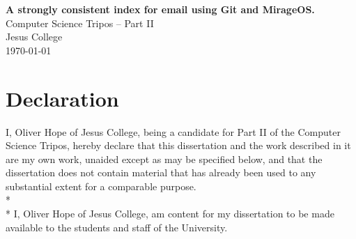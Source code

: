 \documentclass[12pt,a4paper,twoside,openright]{report}
\begin{document}

\thispagestyle{empty}



\vspace*{60mm}
\begin{center}
\Huge
\textbf{A strongly consistent index for email using Git and MirageOS.} \\[5mm]
Computer Science Tripos -- Part II \\[5mm]
Jesus College \\[5mm]
\today  %
\end{center}


\pagestyle{plain}

\newpage

\setcounter{page}{1}

\section*{Declaration}

I, Oliver Hope of Jesus College, being a candidate for Part II of the Computer Science Tripos, hereby declare that this dissertation and the work described in it are my own work, unaided except as may be specified below, and that the dissertation does not contain material that has already been used to any substantial extent for a comparable purpose.
\\*
\\*
I, Oliver Hope of Jesus College,
am content for my dissertation to be made available to the students and staff of the University.

\bigskip
{}

\medskip
{}
\end{document}
